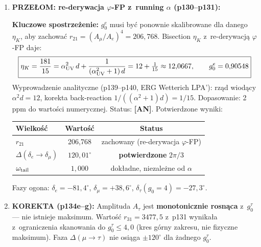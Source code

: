 \begin{enumerate}
  \item \textbf{PRZE\L{}OM: re-derywacja $\varphi$-FP z~running $\alpha$ (p130--p131):}

    \textbf{Kluczowe spostrzeżenie:} $g_0^e$ musi być ponownie
    skalibrowane dla danego $\eta_K$, aby zachować
    $r_{21} = (A_\mu/A_e)^4 = 206{,}768$.
    Bisection $\eta_K$ z~re-derywacj\k{a} $\varphi$-FP daje:
    \begin{equation}\label{eq:etaK-optimal}
      \boxed{\eta_K = \frac{181}{15} = \alpha_{\rm UV}^2\,d
        + \frac{1}{(\alpha_{\rm UV}^2+1)\,d}
        = 12 + \tfrac{1}{15} \approx 12{,}0667,
        \qquad g_0^e = 0{,}90548}
    \end{equation}
    Wyprowadzenie analityczne (p139--p140, ERG Wetterich LPA'):
    rz\k{a}d wiod\k{a}cy $\alpha^2 d = 12$, korekta back-reaction
    $1/((\alpha^2+1)d) = 1/15$. Dopasowanie: 2\,ppm do warto\'sci
    numerycznej. Status: \textbf{[AN]}.
    Potwierdzone wyniki:
    \begin{center}\small
    \begin{tabular}{lcc}
    \toprule
    \textbf{Wielko\'s\'c} & \textbf{Warto\'s\'c} & \textbf{Status} \\ \midrule
    $r_{21}$ & 206{,}768 & zachowany (re-derywacja $\varphi$-FP) \\
    $\Delta(\delta_e\to\delta_\mu)$ & $120{,}01^\circ$
      & \textbf{potwierdzone} $2\pi/3$ \\
    $\omega_{\rm tail}$ & $1{,}000$ & dok\l{}adne, niezale\.zne od $\alpha$ \\
    \bottomrule
    \end{tabular}
    \end{center}
    Fazy ogona:
    $\delta_e = -81{,}4^\circ$,
    $\delta_\mu = +38{,}6^\circ$,
    $\delta_\tau(g_0=4) = -27{,}3^\circ$.

  \item \textbf{KOREKTA (p134e--g):} Amplituda $A_\tau$ jest
    \textbf{monotonicznie rosn\k{a}ca} z~$g_0^\tau$ --- nie istnieje
    maksimum. Warto\'s\'c $r_{31} = 3477{,}5$ z~p131 wynika\l{}a
    z~ograniczenia skanowania do $g_0^\tau \le 4{,}0$ (kres g\'orny
    zakresu, nie fizyczne maksimum). Faza $\Delta(\mu\to\tau)$ nie
    osi\k{a}ga $\pm120^\circ$ dla \.zadnego $g_0^\tau$.


\end{enumerate}
